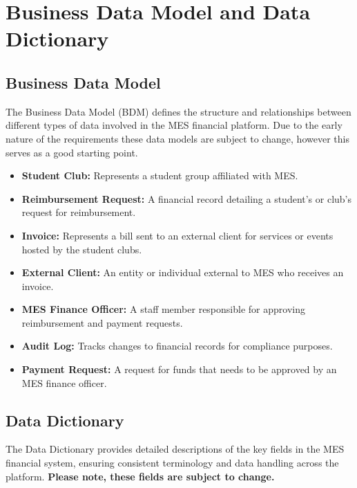 \documentclass[12pt]{article}
\begin{document}
\section{Business Data Model and Data Dictionary}
\subsection{Business Data Model}
The Business Data Model (BDM) defines the structure and relationships between different types of data involved in the MES financial platform. Due to the early nature of the requirements these data models are subject to change, however this serves as a good starting point.

\begin{itemize}
    \item \textbf{Student Club:} Represents a student group affiliated with MES.
    \item \textbf{Reimbursement Request:} A financial record detailing a student's or club's request for reimbursement.
    \item \textbf{Invoice:} Represents a bill sent to an external client for services or events hosted by the student clubs.
    \item \textbf{External Client:} An entity or individual external to MES who receives an invoice.
    \item \textbf{MES Finance Officer:} A staff member responsible for approving reimbursement and payment requests.
    \item \textbf{Audit Log:} Tracks changes to financial records for compliance purposes.
    \item \textbf{Payment Request:} A request for funds that needs to be approved by an MES finance officer.
\end{itemize}

\subsection{Data Dictionary}
The Data Dictionary provides detailed descriptions of the key fields in the MES financial system, ensuring consistent terminology and data handling across the platform. \textbf{Please note, these fields are subject to change.}
\end{document}
